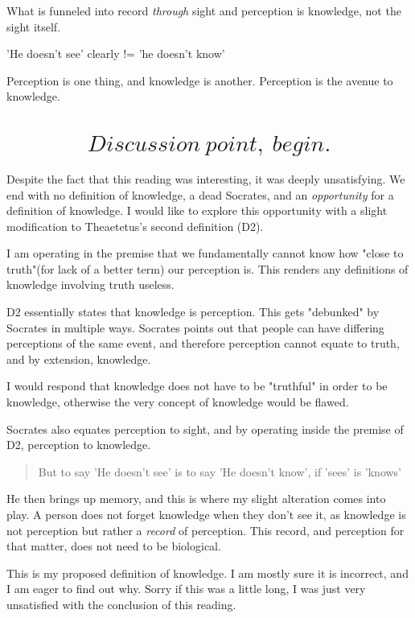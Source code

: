 \documentclass[letterpaper]{article}
\begin{document}
What is funneled into record \emph{through} sight and perception is
knowledge, not the sight itself.

'He doesn't see' clearly != 'he doesn't know'

Perception is one thing, and knowledge is another. Perception is the
avenue to knowledge.

\section{\[Discussion\ point,\ begin.\]}
\label{sec:orga035504}
Despite the fact that this reading was interesting, it was deeply
unsatisfying. We end with no definition of knowledge, a dead Socrates,
and an \emph{opportunity} for a definition of knowledge. I would like to
explore this opportunity with a slight modification to Theaetetus's
second definition (D2).

I am operating in the premise that we fundamentally cannot know how
"close to truth"(for lack of a better term) our perception is. This
renders any definitions of knowledge involving truth useless.

D2 essentially states that knowledge is perception. This gets "debunked"
by Socrates in multiple ways. Socrates points out that people can have
differing perceptions of the same event, and therefore perception cannot
equate to truth, and by extension, knowledge.

I would respond that knowledge does not have to be "truthful" in order
to be knowledge, otherwise the very concept of knowledge would be
flawed.

Socrates also equates perception to sight, and by operating inside the
premise of D2, perception to knowledge.

\begin{quote}
But to say 'He doesn't see' is to say 'He doesn't know', if 'sees' is
'knows'
\end{quote}

He then brings up memory, and this is where my slight alteration comes
into play. A person does not forget knowledge when they don't see it, as
knowledge is not perception but rather a \emph{record} of perception. This
record, and perception for that matter, does not need to be biological.

This is my proposed definition of knowledge. I am mostly sure it is
incorrect, and I am eager to find out why. Sorry if this was a little
long, I was just very unsatisfied with the conclusion of this reading.
\end{document}
